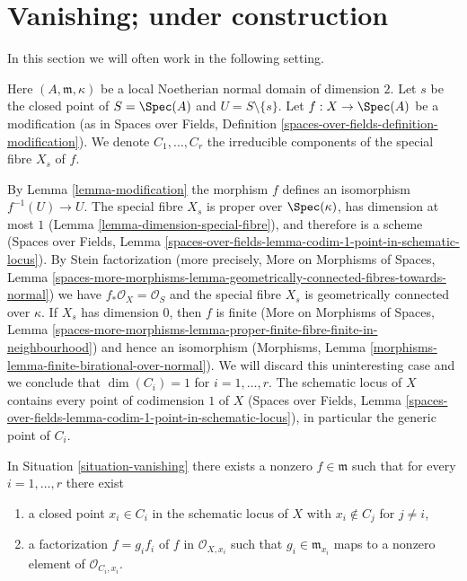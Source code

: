 \section{Vanishing; under construction}
\label{section-vanishing}

\noindent
In this section we will often work in the following setting.

\begin{situation}
\label{situation-vanishing}
Here $(A, \mathfrak m, \kappa)$ be a local Noetherian normal domain of
dimension $2$. Let $s$ be the closed point of $S = \Spec(A)$ and
$U = S \setminus \{s\}$. Let $f : X \to \Spec(A)$ be a modification
(as in Spaces over Fields, Definition
\ref{spaces-over-fields-definition-modification}).
We denote $C_1, \ldots, C_r$ the irreducible
components of the special fibre $X_s$ of $f$.
\end{situation}

\noindent
By Lemma \ref{lemma-modification} the morphism $f$ defines an isomorphism
$f^{-1}(U) \to U$. The special fibre $X_s$ is proper over $\Spec(\kappa)$, has
dimension at most $1$ (Lemma \ref{lemma-dimension-special-fibre}), and
therefore is a scheme (Spaces over Fields, Lemma
\ref{spaces-over-fields-lemma-codim-1-point-in-schematic-locus}).
By Stein factorization (more precisely,
More on Morphisms of Spaces, Lemma
\ref{spaces-more-morphisms-lemma-geometrically-connected-fibres-towards-normal})
we have $f_*\mathcal{O}_X = \mathcal{O}_S$ and
the special fibre $X_s$ is geometrically connected over $\kappa$.
If $X_s$ has dimension $0$, then $f$ is finite
(More on Morphisms of Spaces, Lemma
\ref{spaces-more-morphisms-lemma-proper-finite-fibre-finite-in-neighbourhood})
and hence an isomorphism
(Morphisms, Lemma \ref{morphisms-lemma-finite-birational-over-normal}).
We will discard this uninteresting case and we conclude that $\dim(C_i) = 1$
for $i = 1, \ldots, r$. The schematic locus of $X$ contains every point
of codimension $1$ of $X$ (Spaces over Fields, Lemma
\ref{spaces-over-fields-lemma-codim-1-point-in-schematic-locus}),
in particular the generic point of $C_i$.

\begin{lemma}
\label{lemma-nice-meromorphic-function}
In Situation \ref{situation-vanishing} there exists a nonzero
$f \in \mathfrak m$ such that for every $i = 1, \ldots, r$ there exist
\begin{enumerate}
\item a closed point $x_i \in C_i$ in the schematic locus of $X$
with $x_i \not \in C_j$ for $j \not = i$,
\item a factorization $f = g_i f_i$ of $f$ in $\mathcal{O}_{X, x_i}$
such that $g_i \in \mathfrak m_{x_i}$ maps to a nonzero element
of $\mathcal{O}_{C_i, x_i}$.
\end{enumerate}
\end{lemma}

